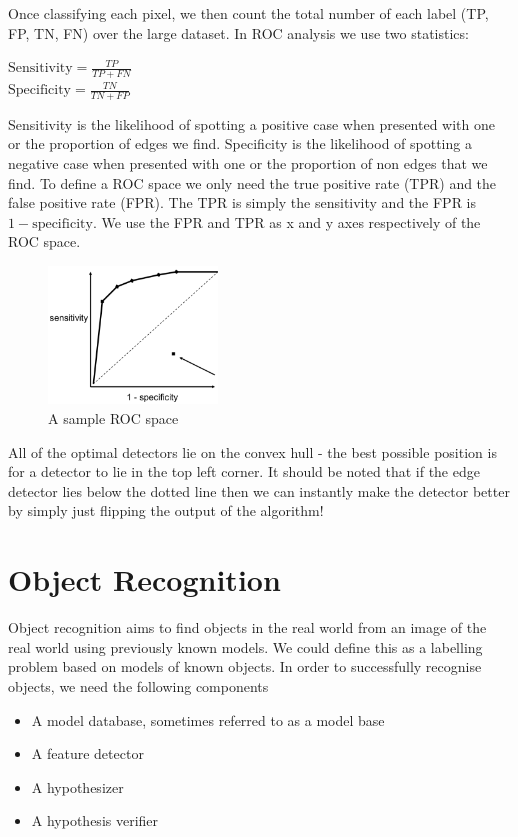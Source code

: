 \documentclass{article}
\begin{document}
Once classifying each pixel, we then count the total number of each label (TP, FP, TN, FN) over the large dataset. In ROC analysis we use two statistics:
	\begin{multicols}{2}
		\noindent
		\centering
			$ \text{Sensitivity} = \frac{TP}{TP+FN}$ \\
			$ \text{Specificity} = \frac{TN}{TN+FP}$
	\end{multicols}	
	Sensitivity is the likelihood of spotting a positive case when presented with one or the proportion of edges we find. Specificity is the likelihood of spotting a negative case when presented with one or the proportion of non edges that we find. To define a ROC space we only need the true positive rate (TPR) and the false positive rate (FPR). The TPR is simply the sensitivity and the FPR is $1 - \text{specificity}$. We use the FPR and TPR as x and y axes respectively of the ROC space.
	
	\begin{figure}
		\centering
		\includegraphics[width=0.4\textwidth]{roc_analysis}
		\caption{A sample ROC space}
		\label{fig:roc_analysis}
	\end{figure}
	
	All of the optimal detectors lie on the convex hull - the best possible position is for a detector to lie in the top left corner. It should be noted that if the edge detector lies below the dotted line then we can instantly make the detector better by simply just flipping the output of the algorithm!
		
	\section{Object Recognition}
	Object recognition aims to find objects in the real world from an image of the real world using previously known models. We could define this as a labelling problem based on models of known objects. In order to successfully recognise objects, we need the following components
	\begin{itemize}
		\item A model database, sometimes referred to as a model base
		\item A feature detector
		\item A hypothesizer
		\item A hypothesis verifier
	\end{itemize}
\end{document}
